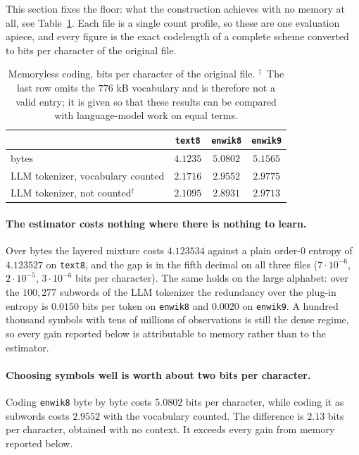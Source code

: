 \documentclass[11pt]{article}
\begin{document}
This section fixes the floor: what the construction achieves with no
memory at all, see Table~\ref{tab:memoryless}.  Each file is a single count
profile, so these are one evaluation apiece, and every figure is the
exact codelength of a complete scheme converted to bits per character of
the original file.

\begin{table}[ht]
\centering
\begin{tabular}{lccc}
\toprule
 & \texttt{text8} & \texttt{enwik8} & \texttt{enwik9} \\
\midrule
bytes                                  & $4.1235$ & $5.0802$ & $5.1565$ \\
LLM tokenizer, vocabulary counted      & $2.1716$ & $2.9552$ & $2.9775$ \\
LLM tokenizer, not counted$^{\dagger}$ & $2.1095$ & $2.8931$ & $2.9713$ \\
\bottomrule
\end{tabular}
\caption{Memoryless coding, bits per character of the original file.
  $^{\dagger}$~The last row omits the $776$ kB vocabulary and is
  therefore not a valid entry; it is given so that these results can be
  compared with language-model work on equal terms.}
\label{tab:memoryless}
\end{table}

\paragraph{The estimator costs nothing where there is nothing to learn.}
Over bytes the layered mixture costs $4.123534$ against a plain order-0
entropy of $4.123527$ on \texttt{text8}, and the gap is in the fifth
decimal on all three files ($7\cdot10^{-6}$, $2\cdot10^{-5}$,
$3\cdot10^{-6}$ bits per character).  The same holds on the large alphabet: over the $100{,}277$ subwords of the LLM
tokenizer the redundancy over the plug-in entropy is $0.0150$ bits per
token on \texttt{enwik8} and $0.0020$ on \texttt{enwik9}.  A hundred thousand symbols with tens of millions of
observations is still the dense regime, so every gain reported below is
attributable to memory rather than to the estimator.

\paragraph{Choosing symbols well is worth about two bits per character.}
Coding \texttt{enwik8} byte by byte costs $5.0802$ bits per character,
while coding it as subwords costs $2.9552$ with the vocabulary counted.
The difference is $2.13$ bits per character, obtained with no
context.  It exceeds every gain from memory reported below.
\end{document}
